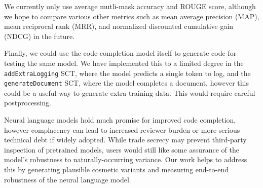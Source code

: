 \documentclass[sigconf,review,anonymous]{acmart}
\begin{document}
  We currently only use average mutli-mask accuracy and ROUGE score, although we hope to compare various other metrics such as mean average precision (MAP), mean reciprocal rank (MRR), and normalized discounted cumulative gain (NDCG) in the future.

  Finally, we could use the code completion model itself to generate code for testing the same model. We have implemented this to a limited degree in the \lstinline|addExtraLogging| SCT, where the model predicts a single token to log, and the \lstinline|generateDocument| SCT, where the model completes a document, however this could be a useful way to generate extra training data. This would require careful postprocessing.

  Neural language models hold much promise for improved code completion, however complacency can lead to increased reviewer burden or more serious technical debt if widely adopted. While trade secrecy may prevent third-party inspection of pretrained models, users would still like some assurance of the model's robustness to naturally-occurring variance. Our work helps to address this by generating plausible cosmetic variants and measuring end-to-end robustness of the neural language model.
  \pagebreak
  
  \appendix
\end{document}

